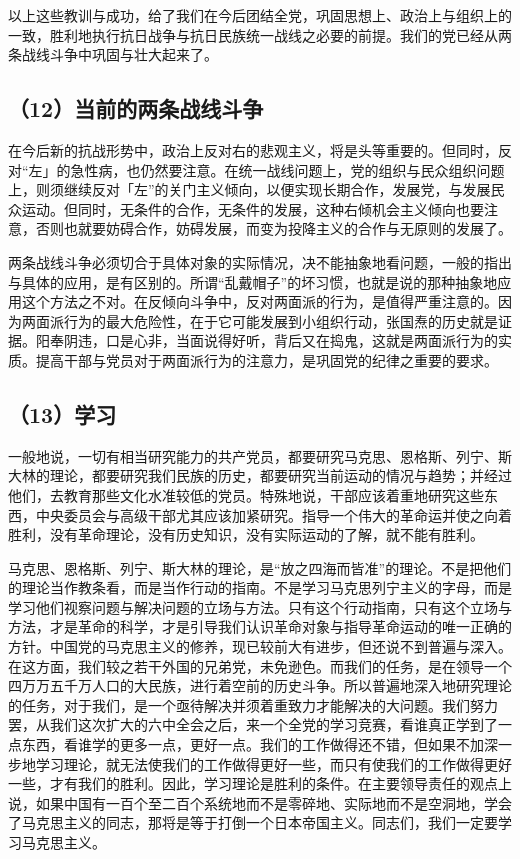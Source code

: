 以上这些教训与成功，给了我们在今后团结全党，巩固思想上、政治上与组织上的一致，胜利地执行抗日战争与抗日民族统一战线之必要的前提。我们的党已经从两条战线斗争中巩固与壮大起来了。

\subsection{（12）当前的两条战线斗争}

在今后新的抗战形势中，政治上反对右的悲观主义，将是头等重要的。但同时，反对“左」的急性病，也仍然要注意。在统一战线问题上，党的组织与民众组织问题上，则须继续反对「左”的关门主义倾向，以便实现长期合作，发展党，与发展民众运动。但同时，无条件的合作，无条件的发展，这种右倾机会主义倾向也要注意，否则也就要妨碍合作，妨碍发展，而变为投降主义的合作与无原则的发展了。

两条战线斗争必须切合于具体对象的实际情况，决不能抽象地看问题，一般的指出与具体的应用，是有区别的。所谓“乱戴帽子”的坏习惯，也就是说的那种抽象地应用这个方法之不对。在反倾向斗争中，反对两面派的行为，是值得严重注意的。因为两面派行为的最大危险性，在于它可能发展到小组织行动，张国焘的历史就是证据。阳奉阴违，口是心非，当面说得好听，背后又在捣鬼，这就是两面派行为的实质。提高干部与党员对于两面派行为的注意力，是巩固党的纪律之重要的要求。

\subsection{（13）学习}

一般地说，一切有相当研究能力的共产党员，都要研究马克思、恩格斯、列宁、斯大林的理论，都要研究我们民族的历史，都要研究当前运动的情况与趋势；并经过他们，去教育那些文化水准较低的党员。特殊地说，干部应该着重地研究这些东西，中央委员会与高级干部尤其应该加紧研究。指导一个伟大的革命运并使之向着胜利，没有革命理论，没有历史知识，没有实际运动的了解，就不能有胜利。

马克思、恩格斯、列宁、斯大林的理论，是“放之四海而皆准”的理论。不是把他们的理论当作教条看，而是当作行动的指南。不是学习马克思列宁主义的字母，而是学习他们视察问题与解决问题的立场与方法。只有这个行动指南，只有这个立场与方法，才是革命的科学，才是引导我们认识革命对象与指导革命运动的唯一正确的方针。中国党的马克思主义的修养，现已较前大有进步，但还说不到普遍与深入。在这方面，我们较之若干外国的兄弟党，未免逊色。而我们的任务，是在领导一个四万万五千万人口的大民族，进行着空前的历史斗争。所以普遍地深入地研究理论的任务，对于我们，是一个亟待解决并须着重致力才能解决的大问题。我们努力罢，从我们这次扩大的六中全会之后，来一个全党的学习竞赛，看谁真正学到了一点东西，看谁学的更多一点，更好一点。我们的工作做得还不错，但如果不加深一步地学习理论，就无法使我们的工作做得更好一些，而只有使我们的工作做得更好一些，才有我们的胜利。因此，学习理论是胜利的条件。在主要领导责任的观点上说，如果中国有一百个至二百个系统地而不是零碎地、实际地而不是空洞地，学会了马克思主义的同志，那将是等于打倒一个日本帝国主义。同志们，我们一定要学习马克思主义。

